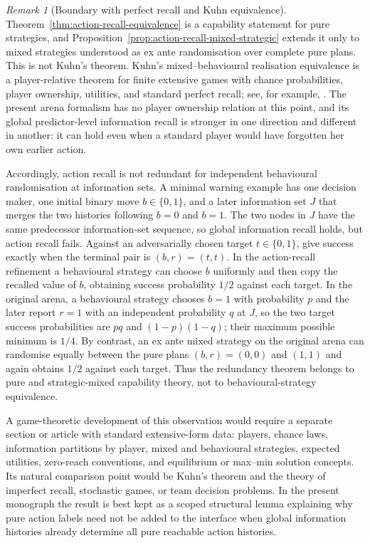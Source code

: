 \documentclass[11pt]{article}
\theoremstyle{plain}
\theoremstyle{definition}
\theoremstyle{remark}
\newtheorem{remark}[theorem]{Remark}
\begin{document}
\begin{remark}[Boundary with perfect recall and Kuhn equivalence]
\label{rem:action-recall-kuhn-boundary}
Theorem~\ref{thm:action-recall-equivalence} is a capability statement for pure
strategies, and Proposition~\ref{prop:action-recall-mixed-strategic} extends it
only to mixed strategies understood as ex ante randomisation over complete pure
plans. This is not Kuhn's theorem. Kuhn's mixed--behavioural realisation
equivalence is a player-relative theorem for finite extensive games with chance
probabilities, player ownership, utilities, and standard perfect recall; see,
for example, \cite{kuhn,osbornerubinstein}. The present arena formalism has no
player ownership relation at this point, and its global predictor-level
information recall is stronger in one direction and different in another: it can
hold even when a standard player would have forgotten her own earlier action.

Accordingly, action recall is not redundant for independent behavioural
randomisation at information sets. A minimal warning example has one decision
maker, one initial binary move $b\in\{0,1\}$, and a later information set $J$
that merges the two histories following $b=0$ and $b=1$. The two nodes in $J$
have the same predecessor information-set sequence, so global information recall
holds, but action recall fails. Against an adversarially chosen target
$t\in\{0,1\}$, give success exactly when the terminal pair is
$(b,r)=(t,t)$. In the action-recall refinement a behavioural strategy can choose
$b$ uniformly and then copy the recalled value of $b$, obtaining success
probability $1/2$ against each target. In the original arena, a behavioural
strategy chooses $b=1$ with probability $p$ and the later report $r=1$ with an
independent probability $q$ at $J$, so the two target success probabilities are
$pq$ and $(1-p)(1-q)$; their maximum possible minimum is $1/4$. By contrast,
an ex ante mixed strategy on the original arena can randomise equally between
the pure plans $(b,r)=(0,0)$ and $(1,1)$ and again obtains $1/2$ against each
target. Thus the redundancy theorem belongs to pure and strategic-mixed
capability theory, not to behavioural-strategy equivalence.

A game-theoretic development of this observation would require a separate
section or article with standard extensive-form data: players, chance laws,
information partitions by player, mixed and behavioural strategies, expected
utilities, zero-reach conventions, and equilibrium or max--min solution
concepts. Its natural comparison point would be Kuhn's theorem and the theory of
imperfect recall, stochastic games, or team decision problems. In the present
monograph the result is best kept as a scoped structural lemma explaining why
pure action labels need not be added to the interface when global information
histories already determine all pure reachable action histories.
\end{remark}
\end{document}
